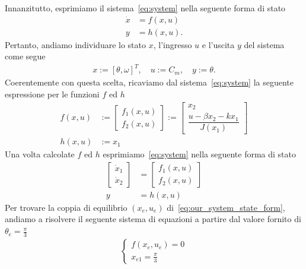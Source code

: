 \documentclass[a4paper, 11pt]{article}
\begin{document}
Innanzitutto, esprimiamo il sistema~\eqref{eq:system} nella seguente forma di stato
%
\begin{subequations}
	\begin{align}\label{eq:state_form}
		\dot{x} & = f(x,u)
		\\
		y       & = h(x,u).
	\end{align}
\end{subequations}
%
Pertanto, andiamo individuare lo stato $x$, l'ingresso $u$ e l'uscita $y$ del sistema come segue 
%
\begin{align*}
	x := \left [ \theta, \omega \right ]^T, \quad u := C_m , \quad y := \theta.
\end{align*}
%
Coerentemente con questa scelta, ricaviamo dal sistema~\eqref{eq:system} la seguente espressione per le funzioni $f$ ed $h$
%
\begin{align}
	f(x,u) & := 
	\begin{bmatrix}
		f_1(x,u)
		\\[0.5em] 
		f_2(x,u)
	\end{bmatrix} :=
	\begin{bmatrix}
		x_2
		\\[0.5em] 
		\dfrac{u - \beta x_2 - kx_1}{J(x_1)}
	\end{bmatrix}
	\\[0.5em] 
	h(x,u) & := x_1
\end{align}
%
Una volta calcolate $f$ ed $h$ esprimiamo~\eqref{eq:system} nella seguente forma di stato
%
\begin{subequations}\label{eq:our_system_state_form}
	\begin{align}
		\begin{bmatrix}
			\dot{x}_1
			\\
			\dot{x}_2
		\end{bmatrix} & = 
		\begin{bmatrix}
			f_1(x,u)
			\\[0.5em] 
			f_2(x,u)
		\end{bmatrix}\label{eq:state_form_1}
		\\[0.5em]
		y               & = h(x, u)
	\end{align}
\end{subequations}
%
Per trovare la coppia di equilibrio $(x_e, u_e)$ di~\eqref{eq:our_system_state_form}, andiamo a risolvere il seguente sistema di equazioni a partire dal valore fornito di $\theta_e=\frac{\pi}{3}$
%
\begin{align}
	\left\{\begin{matrix}
		       f(x_e, u_e)=0  
		       \\[0.5em]
		       x_{e1} = \frac{\pi}{3}
	       \end{matrix}\right.
\end{align}
\end{document}
